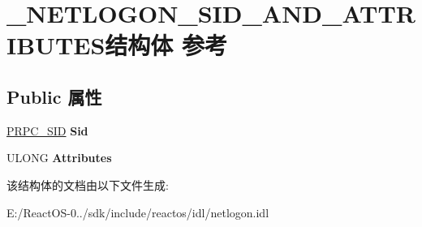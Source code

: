 \hypertarget{struct___n_e_t_l_o_g_o_n___s_i_d___a_n_d___a_t_t_r_i_b_u_t_e_s}{}\section{\+\_\+\+N\+E\+T\+L\+O\+G\+O\+N\+\_\+\+S\+I\+D\+\_\+\+A\+N\+D\+\_\+\+A\+T\+T\+R\+I\+B\+U\+T\+E\+S结构体 参考}
\label{struct___n_e_t_l_o_g_o_n___s_i_d___a_n_d___a_t_t_r_i_b_u_t_e_s}
\subsection*{Public 属性}
\begin{DoxyCompactItemize}
\item 
\mbox{\label{struct___n_e_t_l_o_g_o_n___s_i_d___a_n_d___a_t_t_r_i_b_u_t_e_s_a9159ab34d13bd6c5d780f0a12ee542da}} 
\hyperlink{struct___r_p_c___s_i_d}{P\+R\+P\+C\+\_\+\+S\+ID} {\bfseries Sid}
\item 
\mbox{\label{struct___n_e_t_l_o_g_o_n___s_i_d___a_n_d___a_t_t_r_i_b_u_t_e_s_ac45ed31489751c22a6f0c54534e71171}} 
U\+L\+O\+NG {\bfseries Attributes}
\end{DoxyCompactItemize}


该结构体的文档由以下文件生成\+:\begin{DoxyCompactItemize}
\item 
E\+:/\+React\+O\+S-\/0../sdk/include/reactos/idl/netlogon.\+idl\end{DoxyCompactItemize}
